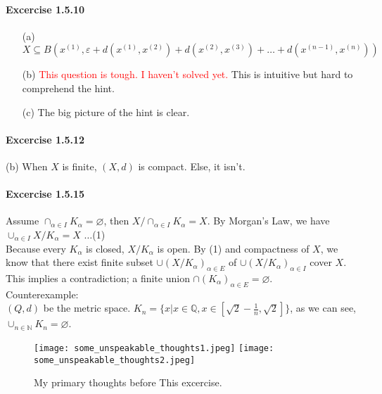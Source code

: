 \paragraph{Excercise 1.5.10} 
\begin{itemize}
\item[(a)]$X \subseteq B(x^{(1)},\varepsilon+d(x^{(1)},x^{(2)})+d(x^{(2)},x^{(3)})+\dots+d(x^{(n-1)},x^{(n)}))$
\item[(b)]\textcolor{red}{This question is tough. I haven't solved yet.} This is intuitive but hard to comprehend the hint.
\item[(c)]The big picture of the hint is clear.
\end{itemize}

\paragraph{Excercise 1.5.12}(b) When $X$ is finite, $(X,d)$ is compact. Else, it isn't.
\paragraph{Excercise 1.5.15} Assume $\cap_{\alpha\in I}K_{\alpha} = \varnothing$, then $X/\cap_{\alpha\in I}K_{\alpha}=X$. By Morgan's Law, we have $\cup_{\alpha\in I} X/K_{\alpha}=X$ $\dots$(1)\\
Because every $K_{\alpha}$ is closed, $X/K_{\alpha}$ is open. By (1) and compactness of $X$, we know that there exist finite subset $\cup(X/K_{\alpha})_{\alpha\in E}$ of $\cup(X/K_{\alpha})_{\alpha\in I}$ cover $X$. This implies a contradiction; a finite union $\cap(K_{\alpha})_{\alpha\in E}=\varnothing$.\\
Counterexample:\\$(Q,d)$ be the metric space. $K_{n}=\{x|x\in \mathbb{Q}, x\in[\sqrt{2}-\frac{1}{n},\sqrt{2}]\}$, as we can see, $\cup_{n\in\mathbb{N}}K_{n}=\varnothing$.

\begin{figure}[H]
\centering
\texttt{[image: some\_unspeakable\_thoughts1.jpeg]}
\texttt{[image: some\_unspeakable\_thoughts2.jpeg]}
\caption{My primary thoughts before This excercise.}
\end{figure}





